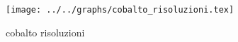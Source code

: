 \begin{figure}[h] \centering \texttt{[image: ../../graphs/cobalto\_risoluzioni.tex]}\caption{cobalto risoluzioni}\label{gr:cobalto_risoluzioni} \end{figure}

